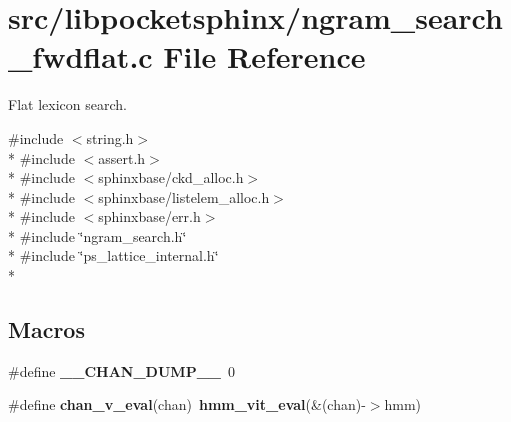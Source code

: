 \section{src/libpocketsphinx/ngram\-\_\-search\-\_\-fwdflat.c File Reference}
\label{ngram__search__fwdflat_8c}


Flat lexicon search.  


{\ttfamily \#include $<$string.\-h$>$}\\*
{\ttfamily \#include $<$assert.\-h$>$}\\*
{\ttfamily \#include $<$sphinxbase/ckd\-\_\-alloc.\-h$>$}\\*
{\ttfamily \#include $<$sphinxbase/listelem\-\_\-alloc.\-h$>$}\\*
{\ttfamily \#include $<$sphinxbase/err.\-h$>$}\\*
{\ttfamily \#include \char`\"{}ngram\-\_\-search.\-h\char`\"{}}\\*
{\ttfamily \#include \char`\"{}ps\-\_\-lattice\-\_\-internal.\-h\char`\"{}}\\*
\subsection*{Macros}
\begin{DoxyCompactItemize}
\item 
\#define {\bfseries \-\_\-\-\_\-\-C\-H\-A\-N\-\_\-\-D\-U\-M\-P\-\_\-\-\_\-}~0\label{ngram__search__fwdflat_8c_a58360b0a332f35742f89edce94c649aa}

\item 
\#define {\bfseries chan\-\_\-v\-\_\-eval}(chan)~{\bf hmm\-\_\-vit\-\_\-eval}(\&(chan)-\/$>$hmm)\label{ngram__search__fwdflat_8c_a268c1fbc6483e1ab06c007222f08d9ad}

\end{DoxyCompactItemize}
